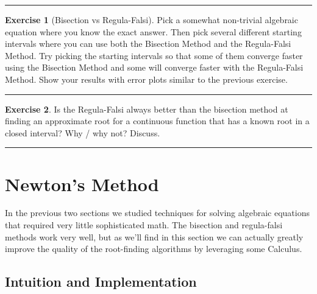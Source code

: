 \documentclass[
]{book}
\theoremstyle{definition}
\theoremstyle{definition}
\theoremstyle{definition}
\newtheorem{exercise}{Exercise}[chapter]
\theoremstyle{remark}
\begin{document}
\begin{center}\rule{0.5\linewidth}{0.5pt}\end{center}

\begin{exercise}[Bisection vs Regula-Falsi]
\protect\hypertarget{exr:unnamed-chunk-96}{}{\label{exr:unnamed-chunk-96} {} }Pick a somewhat non-trivial algebraic equation where you know the exact answer. Then pick several different starting intervals where you can use both the Bisection Method and the Regula-Falsi Method. Try picking the starting intervals so that some of them converge faster using the Bisection Method and some will converge faster with the Regula-Falsi Method. Show your results with error plots similar to the previous exercise.
\end{exercise}

\begin{center}\rule{0.5\linewidth}{0.5pt}\end{center}

\begin{exercise}
\protect\hypertarget{exr:unnamed-chunk-97}{}{\label{exr:unnamed-chunk-97} }Is the Regula-Falsi always better than the bisection method at finding an approximate root for a continuous function that has a known root in a closed interval? Why / why not? Discuss.
\end{exercise}

\begin{center}\rule{0.5\linewidth}{0.5pt}\end{center}

\hypertarget{newtons-method}{%
\section{Newton's Method}\label{newtons-method}}

In the previous two sections we studied techniques for solving algebraic equations that required very little sophisticated math. The bisection and regula-falsi methods work very well, but as we'll find in this section we can actually greatly improve the quality of the root-finding algorithms by leveraging some Calculus.

\hypertarget{intuition-and-implementation-2}{%
\subsection{Intuition and Implementation}\label{intuition-and-implementation-2}}
\end{document}
